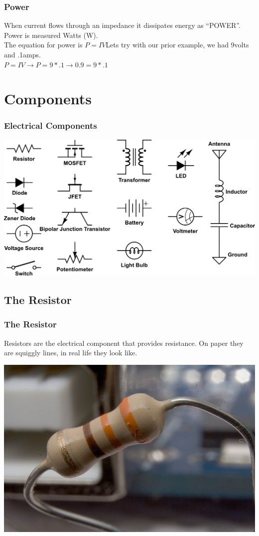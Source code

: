 \documentclass[10pt]{beamer}
\begin{document}
\begin{frame}
\frametitle{Power}
When current flows through an impedance it dissipates energy as ``POWER''. Power is measured Watts (W).\\
The equation for power is $P=IV$\pause Lets try with our prior example, we had 9volts and .1amps.\\
$P=IV \to P=9*.1$\pause$\to 0.9=9*.1$
\end{frame}

\section{Components}
\begin{frame}
\frametitle{Electrical Components}
\begin{center}
\includegraphics[width=\textwidth]{components.png}
\end{center}
\end{frame}

\subsection{The Resistor}
\begin{frame}
\frametitle{The Resistor}
Resistors are the electrical component that provides resistance. On paper they are squiggly lines, in real life they look like.\\\pause
\begin{center}
\includegraphics[height=.8\textheight]{resistor.jpg}
\end{center}
\end{frame}
\end{document}
